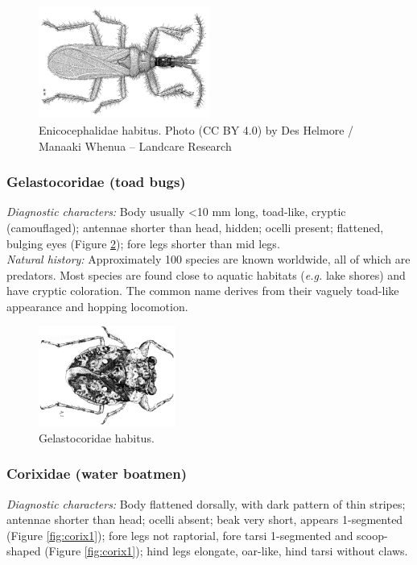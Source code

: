 \documentclass[letterpaper, 11pt]{article}
\begin{document}
\begin{figure}[ht!]
 \centering
 \includegraphics[width=0.5\textwidth]{Enicocephalidae}
 \caption{Enicocephalidae habitus. Photo (CC BY 4.0) by Des Helmore / Manaaki Whenua – Landcare Research}
 \label{fig:enicocephalid}
\end{figure}

\subsubsection{Gelastocoridae (toad bugs)}
\noindent{}\textit{Diagnostic characters:} Body usually \textless{}10 mm long, toad-like, cryptic (camouflaged); antennae shorter than head, hidden; ocelli present; flattened, bulging eyes (Figure \ref{fig:gelasto1}); fore legs shorter than mid legs.\\

\noindent{}\textit{Natural history:} Approximately 100 species are known worldwide, all of which are predators. Most species are found close to aquatic habitats (\textit{e.g.} lake shores) and have cryptic coloration. The common name derives from their vaguely toad-like appearance and hopping locomotion.\\

\begin{figure}[ht!]
 \centering
 \includegraphics[width=0.4\textwidth]{gelastocorid.png}
 \caption{Gelastocoridae habitus. \citep[][Fig. 7:21a]{bhlitem126080aquatic}}
 \label{fig:gelasto1}
\end{figure}

\subsubsection{Corixidae (water boatmen)}
\noindent{}\textit{Diagnostic characters:} Body flattened dorsally, with dark pattern of thin stripes; antennae shorter than head; ocelli absent; beak very short, appears 1-segmented (Figure \ref{fig:corix1}); fore legs not raptorial, fore tarsi 1-segmented and scoop-shaped (Figure \ref{fig:corix1}); hind legs elongate, oar-like, hind tarsi without claws.\\
\end{document}

